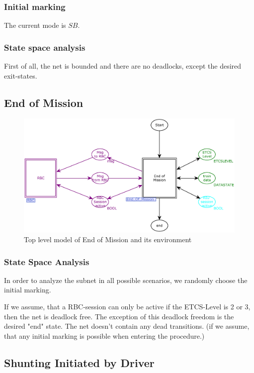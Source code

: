 \documentclass{template/openetcs_article}
\begin{document}
\subsubsection{Initial marking}

The current mode is $\mathit{SB}$.

\subsubsection{State space analysis}
First of all, the net is bounded and there are no deadlocks, except the desired exit-states.


\subsection{End of Mission}

\begin{figure}[htb] 
  \centering
  \includegraphics[scale=0.5]{EoM-toplevel.eps}
  \caption{Top level model of End of Mission and its environment}
  \label{fig:EoM-toplevel}
\end{figure}



\subsubsection{State Space Analysis}
In order to analyze the subnet in all possible scenarios, we randomly choose the initial marking.

If we assume, that a RBC-session can only be active if the ETCS-Level is 2 or 3, then the net is deadlock free. The exception of this deadlock freedom is the desired "end" state.
The net doesn't contain any dead transitions. (if we assume, that any initial marking is possible when entering the procedure.)

\subsection{Shunting Initiated by Driver}
\end{document}
